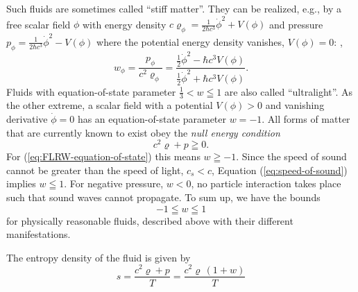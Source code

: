Such fluids are sometimes called “stiff matter”. They can be realized, e.g., by a free scalar field $\phi$ with energy density $c \varrho_\phi = \frac{1}{2\hbar c^3} \dot{\phi}^2 + V(\phi)$ and pressure $p_\phi = \frac{1}{2\hbar c^3} \dot{\phi}^2 - V(\phi)$ where the potential energy density vanishes, $V(\phi) = 0$: \cite[167]{Dodelson-Schmidt-2025}, \cite[198]{Ryden-2017}
\begin{equation}
	w_\phi
	= \frac{p_\phi}{c^2 \varrho_\phi}
	= \frac{\frac{1}{2}\dot{\phi}^2 - \hbar c^3 V(\phi)}{\frac{1}{2}\dot{\phi}^2 + \hbar c^3 V(\phi)}
	.
	\label{eq:scalar-field-equation-of-state-parameter}
\end{equation}
Fluids with equation-of-state parameter $\frac{1}{3} < w \leqq 1$ are also called “ultralight”. \cite{Nemiroff-Patla-2008}
As the other extreme, a scalar field with a potential $V(\phi) > 0$ and vanishing derivative $\dot{\phi} = 0$ has an equation-of-state parameter $w = -1$.
All forms of matter that are currently known to exist obey the \emph{null energy condition}
\begin{equation}
	c^2 \varrho + p \geqq 0
	.
	\label{eq:null-energy-condition}
\end{equation}
For (\ref{eq:FLRW-equation-of-state}) this means 
$w \geqq -1$.
Since the speed of sound cannot be greater than the speed of light, $c_s < c$, Equation (\ref{eq:speed-of-sound}) implies $w \leqq 1$. 
For negative pressure, $w<0$, no particle interaction takes place such that sound waves cannot propagate.
To sum up, we have the bounds
\begin{equation}
	-1 \leqq w \leqq 1
\end{equation}
for physically reasonable fluids, described above with their different manifestations.

The entropy density of the fluid is given by \cite[39]{Dodelson-Schmidt-2025}
\begin{equation}
	s
	= \frac{c^2 \varrho + p}{T}
	= \frac{c^2 \varrho \, (1+w)}{T}
	\label{eq:entropy-density}
\end{equation}


